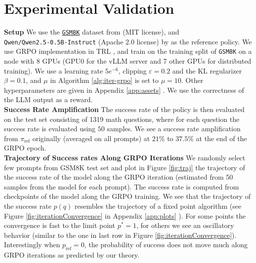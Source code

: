 \documentclass[11pt,reqno]{amsart}
\begin{document}
\section{Experimental Validation}\label{Sec:Exp}


\noindent \textbf{Setup} We use  the \href{https://huggingface.co/datasets/openai/gsm8k}{\texttt{GSM8K}} dataset from \cite{Cobbe2021} (MIT license), and\\ {\texttt{Qwen/Qwen2.5-0.5B-Instruct}} (Apache 2.0 license) by \cite{Yang2024d} as the reference policy. We use GRPO implementation in   TRL \citep{vonwerra2022trl}, and train  on  the training split of \texttt{GSM8K} on a node with 8 GPUs (GPU0 for the vLLM server and 7 other GPUs for distributed training). We use a learning rate $5e^{-6}$, clipping $\varepsilon=0.2$  and the KL regularizer $\beta=0.1$, and $\mu$ in Algorithm \ref{alg:iter-grpo} is set to $\mu=10$. Other hyperparameters are given in Appendix \ref{app:assets} . We use the correctness of the LLM output as a reward.\\ 

\noindent \textbf{Success Rate Amplification} The success rate of the policy is then evaluated on the test set consisting of 1319 math questions, where for each question the success rate is evaluated using $50$ samples.   We see a success rate amplification from $\pi_{\mathrm{ref}}$ originally (averaged on all prompts) at $21\%$ to $37.5\%$ at the end of the GRPO epoch.\\

\noindent \textbf{Trajectory of Success rates Along GRPO Iterations} We randomly select few prompts from GSM8K test set and plot in Figure \ref{fig:traj} the trajectory of the success rate of the model along the GRPO iteration (estimated from 50 samples from the model for each prompt). The success rate is computed from checkpoints of the model along the GRPO training.  We see that the trajectory of the success rate $p(q)$ resembles the trajectory of a fixed point algorithm (see Figure \ref{fig:iterationConvergence} in Appendix  \ref{app:plots} ). For some points the convergence is fast to the limit point $p^*=1$, for others we see an oscillatory behavior (similar to the one in  last row in Figure \ref{fig:iterationConvergence}). Interestingly when $p_{\mathrm{ref}}=0$, the probability of success does not move much along GRPO iterations as predicted by our theory. 
\end{document}
